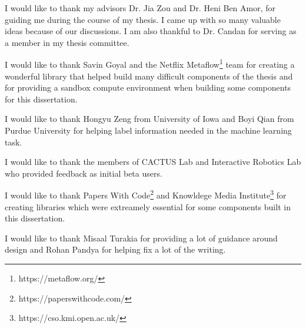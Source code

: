 I would like to thank my advisors Dr. Jia Zou and Dr. Heni Ben Amor, for guiding me during the course of my thesis. I came up with so many valuable ideas because of our discussions. I am also thankful to Dr. Candan for serving as a member in my thesis committee. 

I would like to thank Savin Goyal and the Netflix Metaflow\footnote{https://metaflow.org/} team for creating a wonderful library that helped build many difficult components of the thesis and for providing a sandbox compute environment when building some components for this dissertation. 

I would like to thank Hongyu Zeng from University of Iowa and Boyi Qian from Purdue University for helping label information needed in the machine learning task. 

I would like to thank the members of CACTUS Lab and Interactive Robotics Lab who provided feedback as initial beta users. 

I would like to thank Papers With Code\footnote{https://paperswithcode.com/} and Knowldege Media Institute\footnote{https://cso.kmi.open.ac.uk/} for creating libraries which were extreamely essential for some components built in this dissertation. 

I would like to thank Misaal Turakia for providing a lot of guidance around design and Rohan Pandya for helping fix a lot of the writing. 